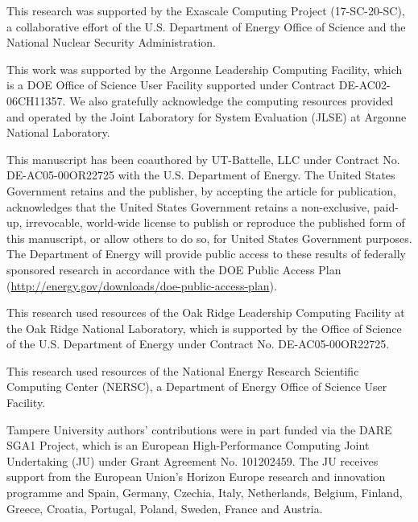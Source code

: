 \documentclass[Afour,sageh,times]{sagej}
\newcounter{notelabelcount}
\begin{document}
\begin{acks}

This research was supported by the Exascale Computing Project (17-SC-20-SC), a collaborative effort of the U.S. Department of Energy Office of Science and the National Nuclear Security Administration.

This work was supported by the Argonne Leadership Computing Facility, which is a DOE Office of Science User Facility supported under Contract DE-AC02-06CH11357. We also gratefully acknowledge the computing resources provided and operated by the Joint Laboratory for System Evaluation (JLSE) at Argonne National Laboratory.

This manuscript has been coauthored by UT-Battelle, LLC under Contract No. DE-AC05-00OR22725 with the U.S. Department of Energy. The United States Government retains and the publisher, by accepting the article for publication, acknowledges that the United States Government retains a non-exclusive, paid-up, irrevocable, world-wide license to publish or reproduce the published form of this manuscript, or allow others to do so, for United States Government purposes.  The Department of Energy will provide public access to these results of federally sponsored research in accordance with the DOE Public Access Plan (\url{http://energy.gov/downloads/doe-public-access-plan}).

This research used resources of the Oak Ridge Leadership Computing Facility at the Oak Ridge National Laboratory, which is supported by the Office of Science of the U.S. Department of Energy under Contract No. DE-AC05-00OR22725.

This research used resources of the National Energy Research Scientific Computing Center (NERSC), a Department of Energy Office of Science User Facility.

Tampere University authors' contributions were in part funded via the DARE SGA1 Project, which is an European High-Performance Computing Joint Undertaking (JU) under Grant Agreement No. 101202459. The JU receives support from the European Union’s Horizon Europe research and innovation programme and Spain, Germany, Czechia, Italy, Netherlands, Belgium, Finland, Greece, Croatia, Portugal, Poland, Sweden, France and Austria.

\end{acks}

\setcounter{notelabelcount}{0}
\theendnotes


%

\end{document}
